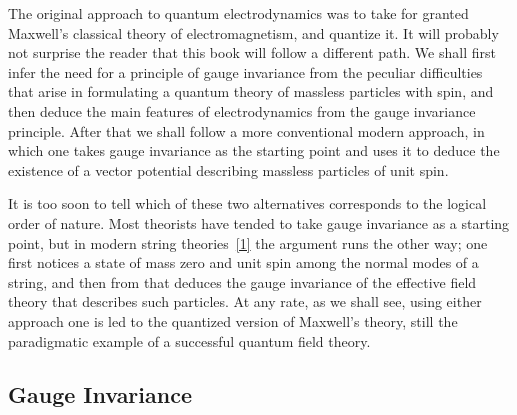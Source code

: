 
The original approach to quantum electrodynamics was to take for granted
Maxwell's classical theory of electromagnetism, and quantize it. It will
probably not surprise the reader that this book will follow a different path.
We shall first infer the need for a principle of gauge invariance from the
peculiar difficulties that arise in formulating a quantum theory of massless
particles with spin, and then deduce the main features of electrodynamics
from the gauge invariance principle. After that we shall follow a more
conventional modern approach, in which one takes gauge invariance as
the starting point and uses it to deduce the existence of a vector potential
describing massless particles of unit spin.

It is too soon to tell which of these two alternatives corresponds to
the logical order of nature. Most theorists have tended to take gauge
invariance as a starting point, but in modern string theories~\hyperref[ref:8.1]{[1]} the argument
runs the other way; one first notices a state of mass zero and unit spin
among the normal modes of a string, and then from that deduces the
gauge invariance of the effective field theory that describes such particles.
At any rate, as we shall see, using either approach one is led to the
quantized version of Maxwell's theory, still the paradigmatic example of
a successful quantum field theory.

\subsection{Gauge Invariance}

